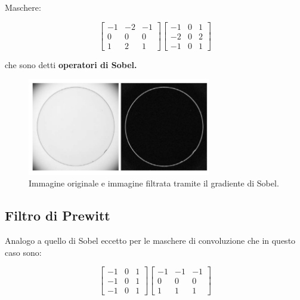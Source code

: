 Maschere:

\begin{center}
    \[
        \begin{bmatrix}
            -1 & -2 & -1 \\
            0  & 0  & 0  \\
            1  & 2  & 1
        \end{bmatrix}
        \begin{bmatrix}
            -1 & 0 & 1 \\
            -2 & 0 & 2 \\
            -1 & 0 & 1
        \end{bmatrix}
    \]
\end{center}

che sono detti \textbf{operatori di Sobel.}

\begin{figure}[H]
    \centering
    \includegraphics[width=8cm, keepaspectratio]{capitoli/immagini/imgs/sobel.png}
    \caption{Immagine originale e immagine filtrata tramite il gradiente di Sobel.}
\end{figure}

\subsection{Filtro di Prewitt}
Analogo a quello di Sobel eccetto per le maschere di convoluzione che in questo
caso sono:
\begin{center}
    \[
        \begin{bmatrix}
            -1 & 0 & 1 \\
            -1 & 0 & 1 \\
            -1 & 0 & 1
        \end{bmatrix}
        \begin{bmatrix}
            -1 & -1 & -1 \\
            0  & 0  & 0  \\
            1  & 1  & 1
        \end{bmatrix}
    \]
\end{center}


